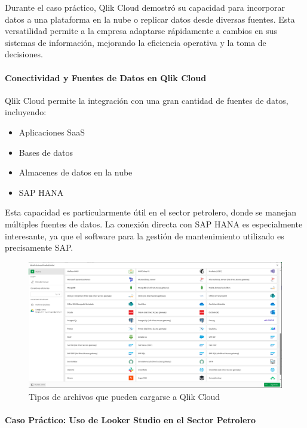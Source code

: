 \documentclass[
  11pt,
  bookmarksnumbered]{article}
\providecommand{\tightlist}{%
  \setlength{\itemsep}{0pt}\setlength{\parskip}{0pt}}
\begin{document}
Durante el caso práctico, Qlik Cloud demostró su capacidad para incorporar datos a una plataforma en la nube o replicar datos desde diversas fuentes.
Esta versatilidad permite a la empresa adaptarse rápidamente a cambios en sus sistemas de información, mejorando la eficiencia operativa y la toma de decisiones.

\hypertarget{conectividad-y-fuentes-de-datos-en-qlik-cloud}{%
\paragraph{Conectividad y Fuentes de Datos en Qlik Cloud}\label{conectividad-y-fuentes-de-datos-en-qlik-cloud}}

Qlik Cloud permite la integración con una gran cantidad de fuentes de datos, incluyendo:

\begin{itemize}
\tightlist
\item
  Aplicaciones SaaS
\item
  Bases de datos
\item
  Almacenes de datos en la nube
\item
  SAP HANA
\end{itemize}

Esta capacidad es particularmente útil en el sector petrolero, donde se manejan múltiples fuentes de datos.
La conexión directa con SAP HANA es especialmente interesante, ya que el software para la gestión de mantenimiento utilizado es precisamente SAP.

\begin{figure}

{\centering \includegraphics[width=4.53in]{media 2/image7} 

}

\caption{Tipos de archivos que pueden cargarse a Qlik Cloud}\label{fig:unnamed-chunk-11}
\end{figure}

\hypertarget{caso-pruxe1ctico-uso-de-looker-studio-en-el-sector-petrolero}{%
\paragraph{Caso Práctico: Uso de Looker Studio en el Sector Petrolero}\label{caso-pruxe1ctico-uso-de-looker-studio-en-el-sector-petrolero}}
\end{document}
